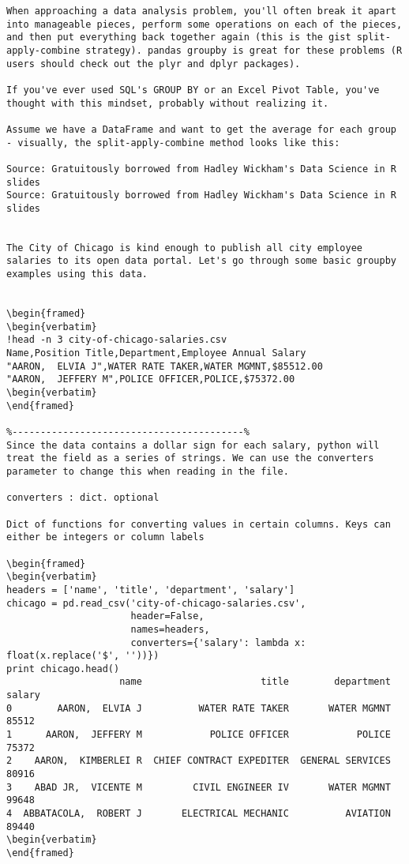 \begin{framed}
\begin{verbatim}
When approaching a data analysis problem, you'll often break it apart into manageable pieces, perform some operations on each of the pieces, and then put everything back together again (this is the gist split-apply-combine strategy). pandas groupby is great for these problems (R users should check out the plyr and dplyr packages).

If you've ever used SQL's GROUP BY or an Excel Pivot Table, you've thought with this mindset, probably without realizing it.

Assume we have a DataFrame and want to get the average for each group - visually, the split-apply-combine method looks like this:

Source: Gratuitously borrowed from Hadley Wickham's Data Science in R slides
Source: Gratuitously borrowed from Hadley Wickham's Data Science in R slides


The City of Chicago is kind enough to publish all city employee salaries to its open data portal. Let's go through some basic groupby examples using this data.


\begin{framed}
\begin{verbatim}
!head -n 3 city-of-chicago-salaries.csv
Name,Position Title,Department,Employee Annual Salary
"AARON,  ELVIA J",WATER RATE TAKER,WATER MGMNT,$85512.00
"AARON,  JEFFERY M",POLICE OFFICER,POLICE,$75372.00
\begin{verbatim}
\end{framed}

%-----------------------------------------%
Since the data contains a dollar sign for each salary, python will treat the field as a series of strings. We can use the converters parameter to change this when reading in the file.

converters : dict. optional

Dict of functions for converting values in certain columns. Keys can either be integers or column labels

\begin{framed}
\begin{verbatim}
headers = ['name', 'title', 'department', 'salary']
chicago = pd.read_csv('city-of-chicago-salaries.csv',
                      header=False,
                      names=headers,
                      converters={'salary': lambda x: float(x.replace('$', ''))})
print chicago.head()
                    name                     title        department  salary
0        AARON,  ELVIA J          WATER RATE TAKER       WATER MGMNT   85512
1      AARON,  JEFFERY M            POLICE OFFICER            POLICE   75372
2    AARON,  KIMBERLEI R  CHIEF CONTRACT EXPEDITER  GENERAL SERVICES   80916
3    ABAD JR,  VICENTE M         CIVIL ENGINEER IV       WATER MGMNT   99648
4  ABBATACOLA,  ROBERT J       ELECTRICAL MECHANIC          AVIATION   89440
\begin{verbatim}
\end{framed}


\end{verbatim}
\end{framed}
